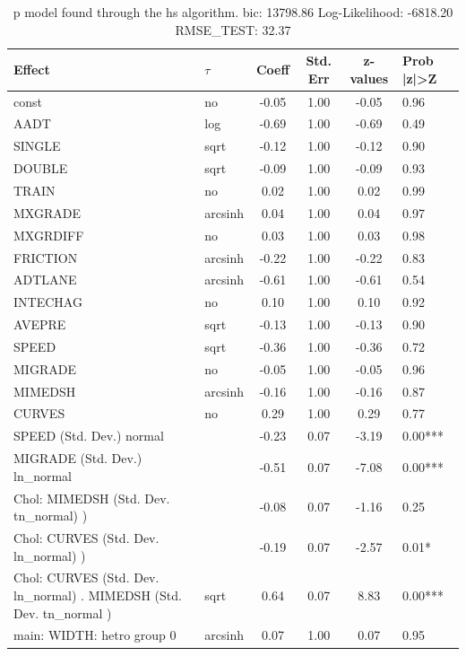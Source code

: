 \begin{table}
	\caption{p model found through the hs algorithm. bic: 13798.86 Log-Likelihood: -6818.20 RMSE_TEST: 32.37}
	\begin{center}
		\begin{tabular}{|l|l|c|c|c|l|}
			\hline
			Effect & $\tau$ & Coeff & Std. Err & z-values & Prob |z|>Z \\
			\hline
			const & no & -0.05 & 1.00 & -0.05 & 0.96 \\
			\hline
			AADT & log & -0.69 & 1.00 & -0.69 & 0.49 \\
			\hline
			SINGLE & sqrt & -0.12 & 1.00 & -0.12 & 0.90 \\
			\hline
			DOUBLE & sqrt & -0.09 & 1.00 & -0.09 & 0.93 \\
			\hline
			TRAIN & no & 0.02 & 1.00 & 0.02 & 0.99 \\
			\hline
			MXGRADE & arcsinh & 0.04 & 1.00 & 0.04 & 0.97 \\
			\hline
			MXGRDIFF & no & 0.03 & 1.00 & 0.03 & 0.98 \\
			\hline
			FRICTION & arcsinh & -0.22 & 1.00 & -0.22 & 0.83 \\
			\hline
			ADTLANE & arcsinh & -0.61 & 1.00 & -0.61 & 0.54 \\
			\hline
			INTECHAG & no & 0.10 & 1.00 & 0.10 & 0.92 \\
			\hline
			AVEPRE & sqrt & -0.13 & 1.00 & -0.13 & 0.90 \\
			\hline
			SPEED & sqrt & -0.36 & 1.00 & -0.36 & 0.72 \\
			\hline
			MIGRADE & no & -0.05 & 1.00 & -0.05 & 0.96 \\
			\hline
			MIMEDSH & arcsinh & -0.16 & 1.00 & -0.16 & 0.87 \\
			\hline
			CURVES & no & 0.29 & 1.00 & 0.29 & 0.77 \\
			\hline
			SPEED (Std. Dev.) normal &  & -0.23 & 0.07 & -3.19 & 0.00*** \\
			\hline
			MIGRADE (Std. Dev.) ln_normal &  & -0.51 & 0.07 & -7.08 & 0.00*** \\
			\hline
			 Chol: MIMEDSH (Std. Dev. tn_normal) ) &  & -0.08 & 0.07 & -1.16 & 0.25 \\
			\hline
			 Chol: CURVES (Std. Dev. ln_normal) ) &  & -0.19 & 0.07 & -2.57 & 0.01* \\
			\hline
			 Chol: CURVES (Std. Dev. ln_normal) . MIMEDSH (Std. Dev.   tn_normal ) & sqrt & 0.64 & 0.07 & 8.83 & 0.00*** \\
			\hline
			main: WIDTH: hetro group 0 & arcsinh & 0.07 & 1.00 & 0.07 & 0.95 \\

\end{tabular}
\end{center}
\end{table}
